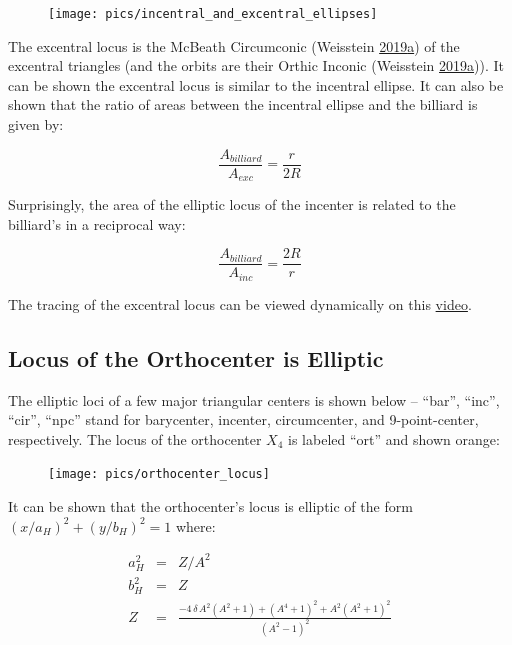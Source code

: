 \documentclass[]{article}
\begin{document}
\begin{figure}[H]

{\centering \texttt{[image: pics/incentral\_and\_excentral\_ellipses]} 

}

\end{figure}

The excentral locus is the McBeath Circumconic (Weisstein \protect\hyperlink{ref-mw}{2019}\protect\hyperlink{ref-mw}{a}) of the excentral triangles (and the orbits are their Orthic Inconic (Weisstein \protect\hyperlink{ref-mw}{2019}\protect\hyperlink{ref-mw}{a})). It can be shown the excentral locus is similar to the incentral ellipse. It can also be shown that the ratio of areas between the incentral ellipse and the billiard is given by:

\[
\frac{A_{billiard}}{A_{exc}}=\frac{r}{2R}
\]

Surprisingly, the area of the elliptic locus of the incenter is related to the billiard's in a reciprocal way:

\[
\frac{A_{billiard}}{A_{inc}}=\frac{2R}{r}
\]

The tracing of the excentral locus can be viewed dynamically on this \href{https://youtu.be/EYQhjgM33TQ}{video}.

\hypertarget{locus-of-the-orthocenter-is-elliptic}{%
\subsection{Locus of the Orthocenter is Elliptic}\label{locus-of-the-orthocenter-is-elliptic}}

The elliptic loci of a few major triangular centers is shown below -- ``bar'', ``inc'', ``cir'', ``npc'' stand for barycenter, incenter, circumcenter, and 9-point-center, respectively. The locus of the orthocenter \(X_{4}\) is labeled ``ort'' and shown orange:

\begin{figure}[H]

{\centering \texttt{[image: pics/orthocenter\_locus]} 

}

\end{figure}

It can be shown that the orthocenter's locus is elliptic of the form \((x/a_H)^2+(y/b_H)^2=1\) where:

\[
\begin{array}{rcl}
a_H^2 & = & Z/A^2 \\
b_H^2 & = & Z \\
Z & = &  {\frac {-4\,\delta\,{A}^{2} \left( {A}^{2}+1 \right)+ \left( {A}^{4}+1 \right) ^{2}+{A}^{2
} \left( {A}^{2}+1 \right) ^{2}}{ \left( {A}^{2}-1 \right) ^{2}}}
\end{array}
\]
\end{document}
